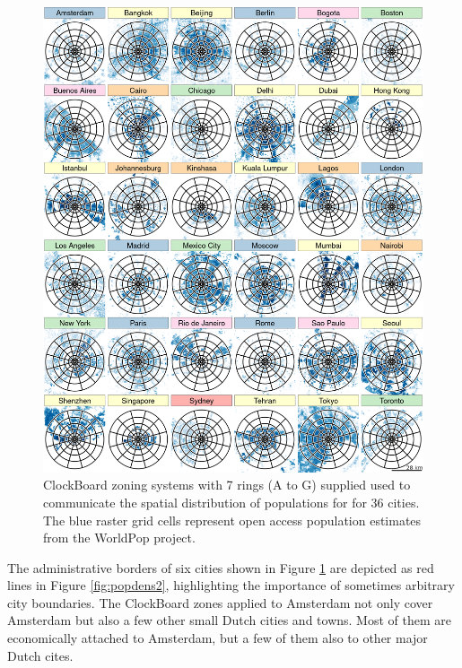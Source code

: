 \documentclass{josis}
\begin{document}
\begin{figure}

{\centering \includegraphics[width=1\linewidth]{cities_p2-scale} 

}

\caption{ClockBoard zoning systems with 7 rings (A to G) supplied used to communicate the spatial distribution of populations for for 36 cities. The blue raster grid cells represent open access population estimates from the WorldPop project.}\label{fig:popdens}
\end{figure}

The administrative borders of six cities shown in Figure \ref{fig:popdens} are depicted as red lines in Figure \ref{fig:popdens2}, highlighting the importance of sometimes arbitrary city boundaries.
The ClockBoard zones applied to Amsterdam not only cover Amsterdam but also a few other small Dutch cities and towns. Most of them are economically attached to Amsterdam, but a few of them also to other major Dutch cites.
\end{document}
